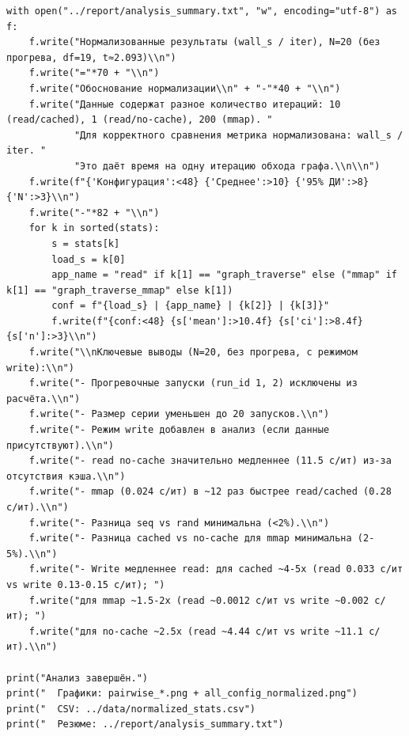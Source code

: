 \documentclass[12pt,a4paper]{article}
\begin{document}
\begin{verbatim}
with open("../report/analysis_summary.txt", "w", encoding="utf-8") as f:
    f.write("Нормализованные результаты (wall_s / iter), N=20 (без прогрева, df=19, t≈2.093)\\n")
    f.write("="*70 + "\\n")
    f.write("Обоснование нормализации\\n" + "-"*40 + "\\n")
    f.write("Данные содержат разное количество итераций: 10 (read/cached), 1 (read/no-cache), 200 (mmap). "
            "Для корректного сравнения метрика нормализована: wall_s / iter. "
            "Это даёт время на одну итерацию обхода графа.\\n\\n")
    f.write(f"{'Конфигурация':<48} {'Среднее':>10} {'95% ДИ':>8} {'N':>3}\\n")
    f.write("-"*82 + "\\n")
    for k in sorted(stats):
        s = stats[k]
        load_s = k[0]
        app_name = "read" if k[1] == "graph_traverse" else ("mmap" if k[1] == "graph_traverse_mmap" else k[1])
        conf = f"{load_s} | {app_name} | {k[2]} | {k[3]}"
        f.write(f"{conf:<48} {s['mean']:>10.4f} {s['ci']:>8.4f} {s['n']:>3}\\n")
    f.write("\\nКлючевые выводы (N=20, без прогрева, с режимом write):\\n")
    f.write("- Прогревочные запуски (run_id 1, 2) исключены из расчёта.\\n")
    f.write("- Размер серии уменьшен до 20 запусков.\\n")
    f.write("- Режим write добавлен в анализ (если данные присутствуют).\\n")
    f.write("- read no-cache значительно медленнее (11.5 с/ит) из-за отсутствия кэша.\\n")
    f.write("- mmap (0.024 с/ит) в ~12 раз быстрее read/cached (0.28 с/ит).\\n")
    f.write("- Разница seq vs rand минимальна (<2%).\\n")
    f.write("- Разница cached vs no-cache для mmap минимальна (2-5%).\\n")
    f.write("- Write медленнее read: для cached ~4-5x (read 0.033 с/ит vs write 0.13-0.15 с/ит); ")
    f.write("для mmap ~1.5-2x (read ~0.0012 с/ит vs write ~0.002 с/ит); ")
    f.write("для no-cache ~2.5x (read ~4.44 с/ит vs write ~11.1 с/ит).\\n")

print("Анализ завершён.")
print("  Графики: pairwise_*.png + all_config_normalized.png")
print("  CSV: ../data/normalized_stats.csv")
print("  Резюме: ../report/analysis_summary.txt")
\end{verbatim}
\end{document}
